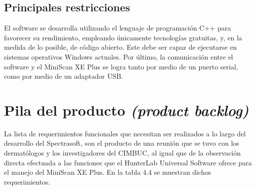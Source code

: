 	\subsection{Principales restricciones}
	
	El software se desarrolla utilizando el lenguaje de programaci\'{o}n C++ para favorecer su rendimiento, empleando \'{u}nicamente tecnolog\'{i}as gratuitas, y, en la medida de lo posible, de c\'{o}digo abierto. Este debe ser capaz de ejecutarse en sistemas operativos Windows actuales. Por \'{u}ltimo, la comunicaci\'{o}n entre el software y el MiniScan XE Plus se logra tanto por medio de un puerto serial, como por medio de un adaptador USB.
	
\section{Pila del producto \textit{(product backlog)}}
	La lista de requerimientos funcionales que necesitan ser realizados a lo largo del desarrollo del Spectrasoft, son el producto de una reuni\'{o}n que se tuvo con los dermat\'{o}logos y los investigadores del CIMBUC, al igual que de la observaci\'{o}n directa efectuada a las funciones que el HunterLab Universal Software ofrece para el manejo del MiniScan XE Plus. En la tabla 4.4 se muestran dichos requerimientos.
	
